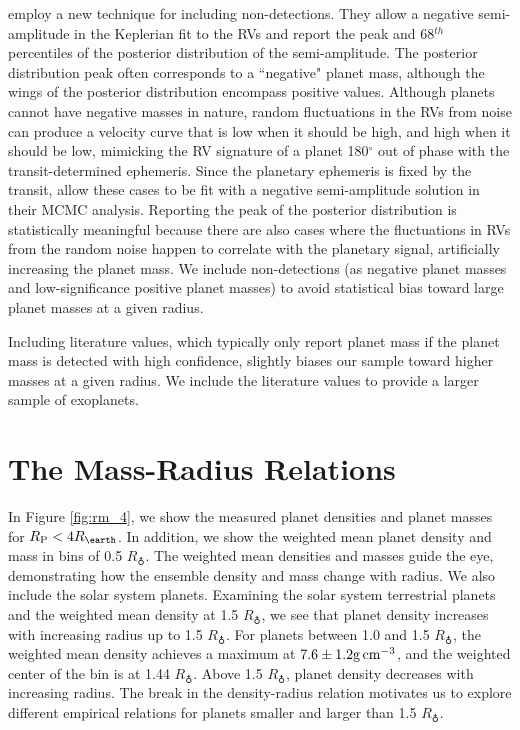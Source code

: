 \documentclass[iop]{emulateapj}
\newcommand{\gcmc}{\ensuremath{\rm g\,cm^{-3}}}
\newcommand{\gcc}{\gcmc}
\newcommand{\rpl}{\ensuremath{R_{\rm P}}}
\newcommand{\rearth}{\ensuremath{R_\earth}}
\begin{document}
\citet{Marcy2014} employ a new technique for including non-detections.  They allow  a negative semi-amplitude in the Keplerian fit to the RVs and report the peak and 68$^{th}$ percentiles of the posterior distribution of the semi-amplitude.  The posterior distribution peak often corresponds to a ``negative" planet mass, although the wings of the posterior distribution encompass positive values.  Although planets cannot have negative masses in nature, random fluctuations in the RVs from noise can produce a velocity curve that is low when it should be high, and high when it should be low, mimicking the RV signature of a planet 180$^\circ$ out of phase with the transit-determined ephemeris.  Since the planetary ephemeris is fixed by the transit, \citet{Marcy2014} allow these cases to be fit with a negative semi-amplitude solution in their MCMC analysis.  Reporting the peak of the posterior distribution is statistically meaningful because there are also cases where the fluctuations in RVs from the random noise happen to correlate with the planetary signal, artificially increasing the planet mass.  We include non-detections (as negative planet masses and low-significance positive planet masses) to avoid statistical bias toward large planet masses at a given radius.

Including literature values, which typically only report planet mass if the planet mass is detected with high confidence, slightly biases our sample toward higher masses at a given radius.  We include the literature values to provide a larger sample of exoplanets.

\section{The Mass-Radius Relations}
In Figure \ref{fig:rm_4}, we show the measured planet densities and planet masses for $\rpl < 4 \rearth$.  In addition, we show the weighted mean planet density and mass in bins of 0.5 \rearth.  The weighted mean densities and masses guide the eye, demonstrating how the ensemble density and mass change with radius.  We also include the solar system planets.  Examining the solar system terrestrial planets and the weighted mean density at 1.5 \rearth, we see that planet density increases with increasing radius up to 1.5 \rearth.  For planets between 1.0 and 1.5 \rearth, the weighted mean density achieves a maximum at $7.6\pm1.2 \gcc$, and the weighted center of the bin is at 1.44 \rearth.  Above 1.5 \rearth, planet density decreases with increasing radius.  The break in the density-radius relation motivates us to explore different empirical relations for planets smaller and larger than 1.5 \rearth.
\end{document}
